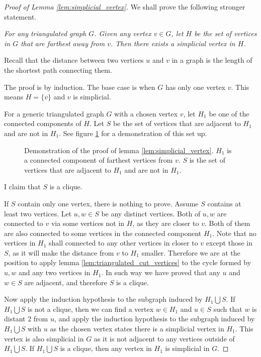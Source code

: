 \begin{proof}[Proof of Lemma \ref{lem:simplicial_vertex}]
	We shall prove the following stronger statement. 

	\emph{
	For any triangulated graph $G$. Given any vertex $v \in G$, let $H$ be the set of vertices in $G$ that are farthest away from $v$. 
	Then there exists a simplicial vertex in $H$.
	}
	
	Recall that the distance between two vertices $u$ and $v$ in a graph is the length of the shortest path connecting them.

	The proof is by induction. 
	The base case is when $G$ has only one vertex $v$. This means $H = \{v\}$ and $v$ is simplicial.

	For a generic triangulated graph $G$ with a chosen vertex $v$, let $H_1$ be one of the connected components of $H$. Let $S$ be the set of vertices that are adjacent to $H_1$ and are not in $H_1$.
	See figure \ref{fig:simplicial_vertex} for a demonstration of this set up.

	\begin{figure}[ht]
		\centering
		
		\caption{Demonstration of the proof of lemma \ref{lem:simplicial_vertex}. $H_1$ is a connected component of farthest vertices from $v$. $S$ is the set of vertices that are adjacent to $H_1$ and are not in $H_1$.
		}
		\label{fig:simplicial_vertex}
	\end{figure}
	I claim that $S$ is a clique.


	If $S$ contain only one vertex, there is nothing to prove.
	Assume $S$ contains at least two vertices. Let $u, w\in S$ be any distinct vertices.
	Both of $u, w$ are connected to $v$ via some vertices not in $H$, as they are closer to $v$. Both of them are also connected to some vertices in the connected component $H_1$.
	Note that no vertices in $H_1$ shall connected to any other vertices in closer to $v$ except those in $S$, as it will make the distance from $v$ to $H_1$ smaller.
	Therefore we are at the position to apply lemma \ref{lem:triangulated_cut_vertices} to the cycle formed by $u, w$ and any two vertices in $H_1$.
	In such way we have proved that any $u$ and $w \in S$ are adjacent, and therefore $S$ is a clique.

	Now apply the induction hypothesis to the subgraph induced by $H_1 \bigcup S$.
	If $H_1 \bigcup S$ is not a clique, then we can find a vertex $w \in H_1$ and $u \in S$ such that $w$ is distant 2 from $u$, and apply the induction hypothesis to the subgraph induced by $H_1 \bigcup S$ with $u$ as the chosen vertex states there is a simplicial vertex in $H_1$. 
	This vertex is also simplicial in $G$ as it is not adjacent to any vertices outside of $H_1 \bigcup S$.
	If $H_1 \bigcup S$ is a clique, then any vertex in $H_1$ is simplicial in $G$.
\end{proof}
